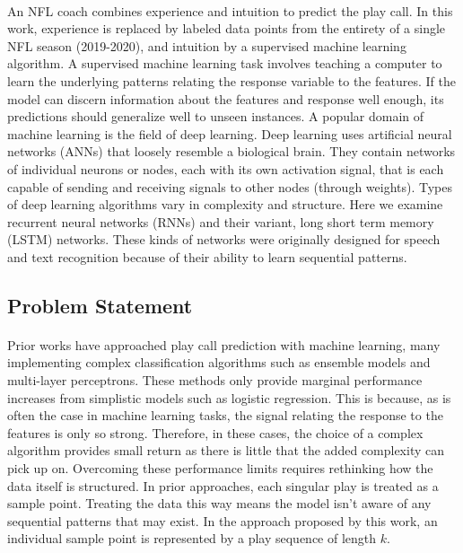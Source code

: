 \documentclass[11pt]{article}
\begin{document}
\begin{multicols*}{2}
            \paragraph{}
                An NFL coach combines experience and intuition to predict the play call. 
                In this work, experience is replaced by labeled data points from the entirety of a single NFL season (2019-2020), and intuition by a supervised machine learning algorithm. 
                A supervised machine learning task involves teaching a computer to learn the underlying patterns relating the response variable to the features. 
                If the model can discern information about the features and response well enough, its predictions should generalize well to unseen instances. 
                A popular domain of machine learning is the field of deep learning. 
                Deep learning uses artificial neural networks (ANNs) that loosely resemble a biological brain. 
                They contain networks of individual neurons or nodes, each with its own activation signal, that is each capable of sending and receiving signals to other nodes (through weights). 
                Types of deep learning algorithms vary in complexity and structure. 
                Here we examine recurrent neural networks (RNNs) and their variant, long short term memory (LSTM) networks. 
                These kinds of networks were originally designed for speech and text recognition because of their ability to learn sequential patterns. 

        \subsection{Problem Statement}
            \paragraph{}
                Prior works have approached play call prediction with machine learning, many implementing complex classification algorithms such as ensemble models and multi-layer perceptrons.
                These methods only provide marginal performance increases from simplistic models such as logistic regression.
                This is because, as is often the case in machine learning tasks, the signal relating the response to the features is only so strong. 
                Therefore, in these cases, the choice of a complex algorithm provides small return as there is little that the added complexity can pick up on.
                Overcoming these performance limits requires rethinking how the data itself is structured.
                In prior approaches, each singular play is treated as a sample point. 
                Treating the data this way means the model isn't aware of any sequential patterns that may exist.
                In the approach proposed by this work, an individual sample point is represented by a play sequence of length $k$. 
        
        \end{multicols*}
\end{document}
